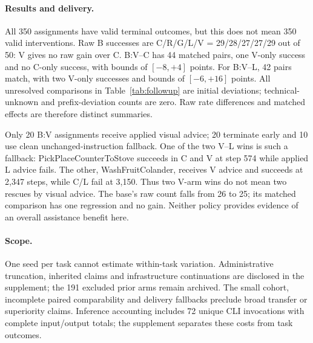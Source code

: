 \begin{table}[t]
\centering\small

\caption{\textbf{Separate 50-case follow-up.} $M$: matched valid pairs; $W/L$: treatment/reference-only successes; $U=50-M$: unresolved comparisons, including deviations. Bounds retain known one-sided endpoints. All counts come from the final reconciled report.}
\label{tab:followup}
\end{table}

\paragraph{Results and delivery.}
All 350 assignments have valid terminal outcomes, but this does not mean 350 valid interventions. Raw B successes are C/R/G/L/V = 29/28/27/27/29 out of 50: V gives no raw gain over C. B:V--C has 44 matched pairs, one V-only success and no C-only success, with bounds of $[-8,+4]$ points. For B:V--L, 42 pairs match, with two V-only successes and bounds of $[-6,+16]$ points. All unresolved comparisons in Table~\ref{tab:followup} are initial deviations; technical-unknown and prefix-deviation counts are zero. Raw rate differences and matched effects are therefore distinct summaries.

Only 20 B:V assignments receive applied visual advice; 20 terminate early and 10 use clean unchanged-instruction fallback. One of the two V--L wins is such a fallback: PickPlaceCounterToStove succeeds in C and V at step 574 while applied L advice fails. The other, WashFruitColander, receives V advice and succeeds at 2,347 steps, while C/L fail at 3,150. Thus two V-arm wins do not mean two rescues by visual advice. The base's raw count falls from 26 to 25; its matched comparison has one regression and no gain. Neither policy provides evidence of an overall assistance benefit here.

\paragraph{Scope.}
One seed per task cannot estimate within-task variation. Administrative truncation, inherited claims and infrastructure continuations are disclosed in the supplement; the 191 excluded prior arms remain archived. The small cohort, incomplete paired comparability and delivery fallbacks preclude broad transfer or superiority claims. Inference accounting includes 72 unique CLI invocations with complete input/output totals; the supplement separates these costs from task outcomes.
